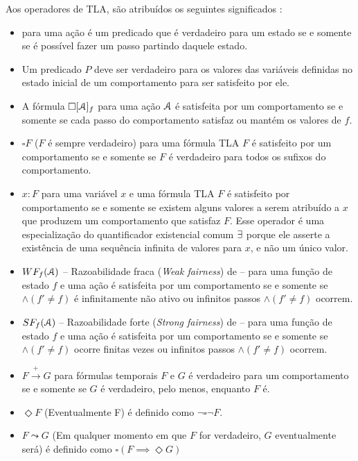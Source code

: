 Aos operadores de TLA, são atribuídos os seguintes significados \cite{tlaformalization}:
\begin{itemize}
  \item \ENABLED \FANCYA para uma ação \FANCYA é um predicado que é verdadeiro para um estado se e somente se é possível fazer um passo \FANCYA partindo daquele estado.
  \item Um predicado $P$ deve ser verdadeiro para os valores das variáveis definidas no estado inicial de um comportamento para ser satisfeito por ele.
  \item A fórmula $\square [\textbf{$\mathcal{A}$}]_f$ para uma ação $\textbf{$\mathcal{A}$}$ é satisfeita por um comportamento se e somente se cada passo do comportamento satisfaz \FANCYA ou mantém os valores de $f$.
  \item $\square F$ ($F$ é sempre verdadeiro) para uma fórmula TLA $F$ é satisfeito por um comportamento se e somente se $F$ é verdadeiro para todos os sufixos do comportamento.
  \item \EE $x : F$ para uma variável $x$ e uma fórmula TLA $F$ é satisfeito por comportamento se e somente se existem alguns valores a serem atribuído a $x$ que produzem um comportamento que satisfaz $F$. Esse operador é uma especialização do quantificador existencial comum $\exists$ porque ele asserte a existência de uma sequência infinita de valores para $x$, e não um único valor.
  \item $WF_f (\textbf{$\mathcal{A}$})$ -- Razoabilidade fraca (\textit{Weak fairness}) de \FANCYA -- para uma função de estado $f$ e uma ação \FANCYA é satisfeita por um comportamento se e somente se \FANCYA $\land (f' \neq f)$ é infinitamente não ativo ou infinitos passos \FANCYA $\land (f' \neq f)$ ocorrem.
  \item $SF_f (\textbf{$\mathcal{A}$})$ -- Razoabilidade forte (\textit{Strong fairness}) de \FANCYA -- para uma função de estado $f$ e uma ação \FANCYA é satisfeita por um comportamento se e somente se \FANCYA $\land (f' \neq f)$ ocorre finitas vezes ou infinitos passos \FANCYA $\land (f' \neq f)$ ocorrem.
  \item $F \stackrel{+}\rightarrow G$ para fórmulas temporais $F$ e $G$ é verdadeiro para um comportamento se e somente se $G$ é verdadeiro, pelo menos, enquanto $F$ é.
  \item $\Diamond F$ (Eventualmente F) é definido como $\neg \square \neg F$.
  \item $F \leadsto G$ (Em qualquer momento em que $F$ for verdadeiro, $G$ eventualmente será) é definido como $\square(F \implies \Diamond G)$
\end{itemize}


